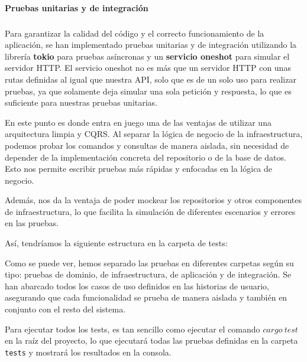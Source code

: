 \paragraph{Pruebas unitarias y de integración}
\subparagraph{}

Para garantizar la calidad del código y el correcto funcionamiento de la aplicación, se han implementado pruebas unitarias y de integración utilizando la librería \textbf{tokio} para pruebas asíncronas y un \textbf{servicio oneshot} para simular el servidor HTTP.
El servicio oneshot no es más que un servidor HTTP con unas rutas definidas al igual que nuestra API, solo que es de un solo uso para realizar pruebas, ya que solamente deja simular una sola petición y respuesta, lo que es suficiente para nuestras pruebas unitarias.

En este punto es donde entra en juego una de las ventajas de utilizar una arquitectura limpia y CQRS.
Al separar la lógica de negocio de la infraestructura, podemos probar los comandos y consultas de manera aislada, sin necesidad de depender de la implementación concreta del repositorio o de la base de datos. Esto nos permite escribir pruebas más rápidas y enfocadas en la lógica de negocio.

Además, nos da la ventaja de poder \gls{mockear} los repositorios y otros componentes de infraestructura, lo que facilita la simulación de diferentes escenarios y errores en las pruebas.

Así, tendríamos la siguiente estructura en la carpeta de tests:


Como se puede ver, hemos separado las pruebas en diferentes carpetas según su tipo: pruebas de dominio, de infraestructura, de aplicación y de integración.
Se han abarcado todos los casos de uso definidos en las historias de usuario, asegurando que cada funcionalidad se prueba de manera aislada y también en conjunto con el resto del sistema.

Para ejecutar todos los tests, es tan sencillo como ejecutar el comando $cargo\ test$ en la raíz del proyecto, lo que ejecutará todas las pruebas definidas en la carpeta \texttt{tests} y mostrará los resultados en la consola.

